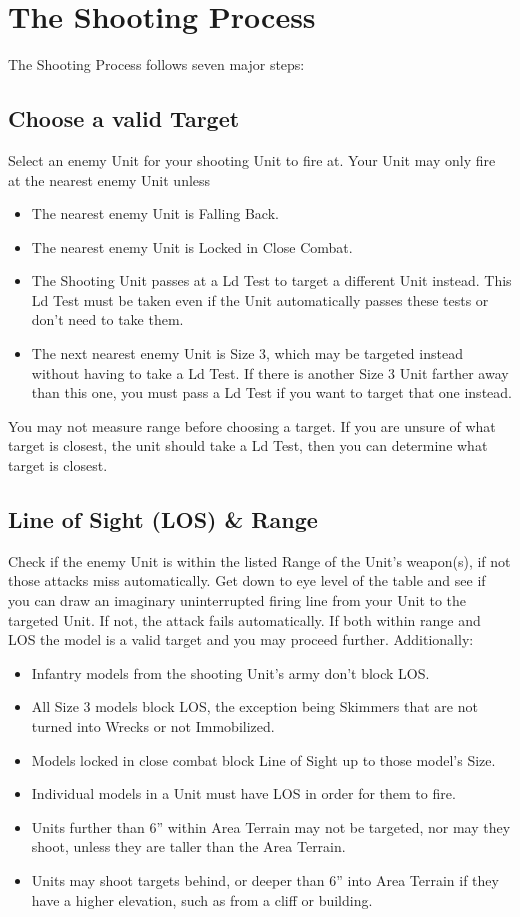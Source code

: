 \section{The Shooting Process}
The Shooting Process follows seven major steps:

\countsubsections

\subsection{Choose a valid Target}
Select an enemy Unit for your shooting Unit to fire at. Your Unit
may only fire at the nearest enemy Unit unless

\begin{itemize}
\item The nearest enemy Unit is Falling Back.
\item The nearest enemy Unit is Locked in Close Combat.
\item The Shooting Unit passes at a Ld Test to target a different
Unit instead. This Ld Test must be taken even if the Unit
automatically passes these tests or don't need to take them.
\item The next nearest enemy Unit is Size 3, which may be
targeted instead without having to take a Ld Test. If there is
another Size 3 Unit farther away than this one, you must
pass a Ld Test if you want to target that one instead.
\end{itemize}

You may not measure range before choosing a target. If you
are unsure of what target is closest, the unit should take a Ld
Test, then you can determine what target is closest.


\subsection{Line of Sight (LOS) \& Range}
Check if the enemy Unit is within the listed Range of the Unit's
weapon(s), if not those attacks miss automatically. Get down
to eye level of the table and see if you can draw an imaginary
uninterrupted firing line from your Unit to the targeted Unit. If
not, the attack fails automatically. If both within range and LOS
the model is a valid target and you may proceed further.
Additionally:
\begin{itemize}
\item Infantry models from the shooting Unit's army don't block
LOS.
\item All Size 3 models block LOS, the exception being
Skimmers that are not turned into Wrecks or not
Immobilized.
\item  Models locked in close combat block Line of Sight up to
those model's Size.
\item  Individual models in a Unit must have LOS in order for
them to fire.
\item  Units further than 6” within Area Terrain may not be
targeted, nor may they shoot, unless they are taller than the
Area Terrain.
\item Units may shoot targets behind, or deeper than 6” into
Area Terrain if they have a higher elevation, such as from a
cliff or building.
\end{itemize}

